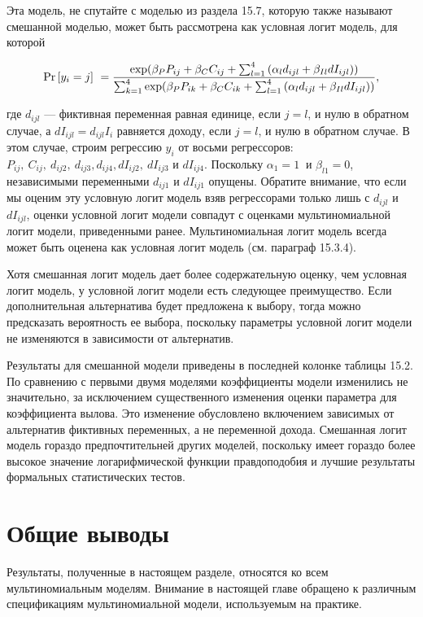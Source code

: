 Эта модель, не спутайте с моделью из раздела 15.7, которую также называют смешанной моделью, может быть рассмотрена как условная логит модель, для которой

\[{\Pr  \left[y_i=j\right]\ }=
\frac{{\rm exp}({\beta }_PP_{ij}+{\beta }_CC_{ij}+\sum^4_{l=1}{({\alpha }_ld_{ijl}+{\beta }_{Il}dI_{ijl})})}
{\sum^4_{k=1}{{\rm exp}({\beta }_PP_{ik}+{\beta }_CC_{ik}+\sum^4_{l=1}{({\alpha }_ld_{ijl}+{\beta }_{Il}dI_{ijl})})}},\] 

где $d_{ijl}$ --- фиктивная переменная равная единице, если $j=l$, и нулю в обратном случае, а $dI_{ijl}=d_{ijl}I_i$ равняется доходу, если $j=l$, и нулю в обратном случае. В этом случае, строим регрессию $y_i$ от восьми регрессоров: $P_{ij},\ C_{ij},\ d_{ij2},\ d_{ij3},d_{ij4},dI_{ij2},\ dI_{ij3}$ и $dI_{ij4}.$ Поскольку ${\alpha }_1=1\ $ и ${\beta }_{l1}=0$, независимыми переменными $d_{ij1}$ и $dI_{ij1}$ опущены. 
Обратите внимание, что если мы оценим эту условную логит модель взяв регрессорами только лишь с $d_{ijl}$ и $dI_{ijl}$, оценки условной логит модели совпадут с оценками мультиномиальной логит модели, приведенными ранее. Мультиномиальная логит модель всегда может быть оценена как условная логит модель (см. параграф 15.3.4).

Хотя смешанная логит модель дает более содержательную оценку, чем условная логит модель, у условной логит модели есть следующее преимущество. Если дополнительная альтернатива будет предложена к выбору, тогда можно предсказать вероятность ее выбора, поскольку параметры условной логит модели не изменяются в зависимости от альтернатив.

Результаты для смешанной модели приведены в последней колонке таблицы 15.2. По сравнению с первыми двумя моделями коэффициенты модели изменились не значительно, за исключением существенного изменения оценки параметра для коэффициента вылова. Это изменение обусловлено включением зависимых от альтернатив фиктивных переменных, а не переменной дохода. Смешанная логит модель гораздо предпочтительней других моделей, поскольку имеет гораздо более высокое значение логарифмической функции правдоподобия и лучшие результаты формальных статистических тестов.

\section{ Общие выводы}

Результаты, полученные в настоящем разделе, относятся ко всем мультиномиальным моделям. Внимание в настоящей главе обращено к различным спецификациям мультиномиальной модели, используемым на практике.

